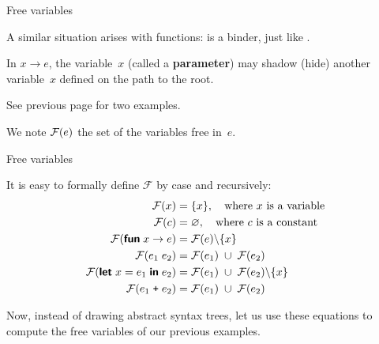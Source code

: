 %
\begin{frame}{Free variables}

  A similar situation arises with functions: \Xfun is a binder, just
  like \Xlet.

  \bigskip

  In \Xfun $x \rightarrow e$, the variable~\(x\) (called a
  \textbf{parameter}) may shadow (hide) another variable~\(x\) defined
  on the path to the root.

  \bigskip

  See previous page for two examples.

  \bigskip

  We note \(\mathcal{F}({e})\) the set of the variables free in~\(e\).

\end{frame}

%
\begin{frame}{Free variables}

  It is easy to formally define \(\mathcal{F}\) by case and
  recursively:
  \begin{align*}
    \mathcal{F}({x}) &= \{x\}, \quad\text{where $x$ is a  variable}\\
    \mathcal{F}({c}) &= \varnothing, \quad\text{where $c$ is a constant}\\
    \mathcal{F}({\textsf{\textbf{fun}} \; x \rightarrow e}) &=
    \mathcal{F}({e}) \backslash \{x\}\\
    \mathcal{F}({e_1 \; e_2}) &= \mathcal{F}({e_1}) \;\cup\; \mathcal{F}({e_2})\\
    \mathcal{F}({\textsf{\textbf{let}} \; x  = e_1 \; \textsf{\textbf{in}} \; e_2}) &=
    \mathcal{F}({e_1}) \;\cup\; \mathcal{F}({e_2}) \backslash \{x\}\\
    \mathcal{F}({e_1 \; \texttt{+} \; e_2}) &= \mathcal{F}({e_1}) \;\cup\; \mathcal{F}({e_2})
  \end{align*}

  Now, instead of drawing abstract syntax trees, let us use these
  equations to compute the free variables of our previous examples.

\end{frame}

